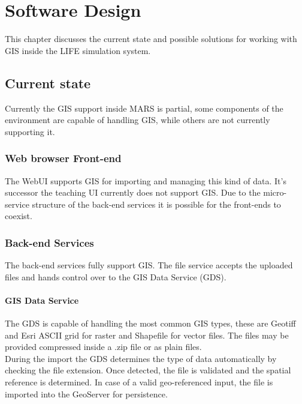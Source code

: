 
\chapter{Software Design}
This chapter discusses the current state and possible solutions for working with GIS inside the LIFE simulation system.



\section{Current state}
Currently the GIS support inside MARS is partial, some components of the environment are capable of handling GIS, while others are not currently supporting it.


\subsection{Web browser Front-end}
The WebUI supports GIS for importing and managing this kind of data. It's successor the teaching UI currently does not support GIS. Due to the micro-service structure of the back-end services it is possible for the front-ends to coexist.

\subsection{Back-end Services}
The back-end services fully support GIS. The file service accepts the uploaded files and hands control over to the GIS Data Service (GDS). 

\subsubsection{GIS Data Service}
The GDS is capable of handling the most common GIS types, these are Geotiff and Esri ASCII grid for raster and Shapefile for vector files. The files may be provided compressed inside a .zip file or as plain files.\\
During the import the GDS determines the type of data automatically by checking the file extension. Once detected, the file is validated and the spatial reference is determined. In case of a valid geo-referenced input, the file is imported into the GeoServer for persistence.


